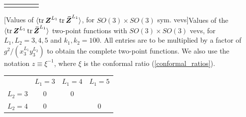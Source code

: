 {\begin{landscape}
\begin{tabular}{ !{\vrule width 1.5pt}c!{\vrule width 1.5pt}c!{\vrule width 1.5pt}c!{\vrule width 1.5pt}c!{\vrule width 1.5pt}c!{\vrule width 1.5pt} }
		 	\hline
		\end{tabular}
		[Values of $\langle \tr \boldsymbol{Z}^{L_1} \tr \boldsymbol{\bar{Z}}^{L_1} \rangle$, for $SO(3) \times SO(3)$ sym. vevs]{Values of the $\langle \tr \boldsymbol{Z}^{L_1} \tr \boldsymbol{\bar{Z}}^{L_1} \rangle$ two-point functions with $SO(3) \times SO(3)$ vevs, for $L_1,L_2 = 3,4,5$ and $k_1,k_2 = 100$. All entries are to be multiplied by a factor of $g^2 / (x_3^{L_1} y_3^{L_2})$ to obtain the complete two-point functions. We also use the notation $z \equiv \xi^{-1}$, where $\xi$ is the conformal ratio (\ref{conformal_ratios}).}
		\vspace*{\fill}
		\newpage
		\vspace*{\fill}
			\begin{tabular}{ !{\vrule width 1.5pt}c!{\vrule width 1.5pt}c!{\vrule width 1.5pt}c!{\vrule width 1.5pt}c!{\vrule width 1.5pt} }
		 	& $L_1=3$ & $L_1=4$ & $L_1=5$ \\
		 	$L_2 = 3$ & $0$ & $0$ &  \\
		 	\hline
		 	$L_2 = 4$ & $0$ & \scalebox{0.75}{$
			\begin{array}{c}
			\big[ 1.27982 \cdot 10^{10} (5 z (-12 i z (2 + z) (9 + z (9 + z)) \\
			+3.14159 (-108 + z (204 + z (435 + 137 z)))) \\
			+21.5319 i z^{6.56155} {}_2F_1(1.56155, 2.56155; 5.12311; -z] \\
			-1.329 i z^{8.27492} {}_2F_1(3.27492, 4.27492; 8.54983; -z] \\
			-15 (1 + z) (-4 i z (18 + z (18 + 5 z)) \\
			+3.14159 (-36 + z (86 + 3 z (32 + 5 z)))) \log(1 + z)) \big] \\
			/ \big[ z^3 (1+z) \big] \\
			\end{array}$} & $0$ \\
		 	\hline

\end{tabular}
\end{landscape}}
